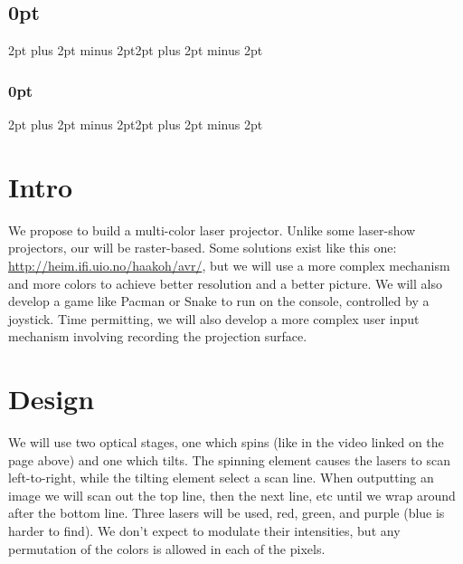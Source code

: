 \documentclass[10pt]{article}
\begin{document}
\setlength{\fboxrule}{.5mm}\setlength{\fboxsep}{1.2mm}
\newlength{\boxlength}\setlength{\boxlength}{\textwidth}
\addtolength{\boxlength}{-4mm}
\begin{center}
\end{center}

\titlespacing\subsection{0pt}{2pt plus 2pt minus 2pt}{2pt plus 2pt minus 2pt}
\titlespacing\subsubsection{0pt}{2pt plus 2pt minus 2pt}{2pt plus 2pt minus 2pt}

\section{Intro}
We propose to build a multi-color laser projector.
Unlike some laser-show projectors, our will be raster-based.
Some solutions exist like this one: \url{http://heim.ifi.uio.no/haakoh/avr/}, but we will use a more complex mechanism and more colors to achieve better resolution and a better picture.
We will also develop a game like Pacman or Snake to run on the console, controlled by a joystick.
Time permitting, we will also develop a more complex user input mechanism involving recording the projection surface.

\section{Design}
We will use two optical stages, one which spins (like in the video linked on the page above) and one which tilts.
The spinning element causes the lasers to scan left-to-right, while the tilting element select a scan line.
When outputting an image we will scan out the top line, then the next line, etc until we wrap around after the bottom line.
Three lasers will be used, red, green, and purple (blue is harder to find).
We don't expect to modulate their intensities, but any permutation of the colors is allowed in each of the pixels.
\end{document}
